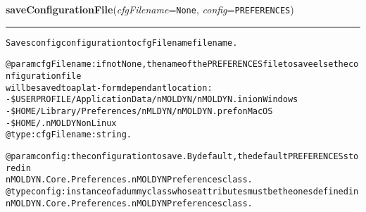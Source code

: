 \hspace{.8\funcindent}\begin{boxedminipage}{\funcwidth}

    \raggedright \textbf{saveConfigurationFile}(\textit{cfgFilename}={\tt None}, \textit{config}={\tt PREFERENCES})

    \vspace{-1.5ex}

    \rule{\textwidth}{0.5\fboxrule}
\setlength{\parskip}{2ex}
\begin{alltt}
Saves {\textbar}config{\textbar} configuration to {\textbar}cfgFilename{\textbar} file name.

@param cfgFilename: if not None, the name of the PREFERENCES file to save else the configuration file
    will be saved to a plat-form dependant location:
        -\$USERPROFILE/Application Data/nMOLDYN/nMOLDYN.ini on Windows
        -\$HOME/Library/Preferences/nMLDYN/nMOLDYN.pref on MacOS
        -\$HOME/.nMOLDYN on Linux
@type: cfgFilename: string.

@param config: the configuration to save. By default, the default PREFERENCES stored in 
    nMOLDYN.Core.Preferences.nMOLDYNPreferences class.
@type config: instance of a dummy class whose attributes must be the ones defined in 
    nMOLDYN.Core.Preferences.nMOLDYNPreferences class.
\end{alltt}

\setlength{\parskip}{1ex}
    \end{boxedminipage}

    \label{nMOLDYN:Core:Config:loadConfigurationFile}

    \vspace{0.5ex}

